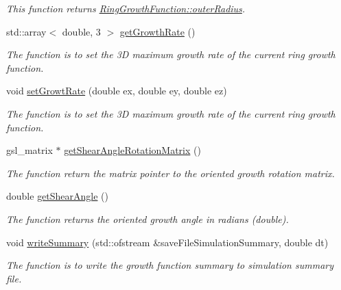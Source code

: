 \begin{DoxyCompactItemize}
\begin{DoxyCompactList}\small\item\em This function returns \hyperlink{classRingGrowthFunction_a8b7d5268d9d47f112b56feef58193649}{Ring\+Growth\+Function\+::outer\+Radius}. \end{DoxyCompactList}\item 
std\+::array$<$ double, 3 $>$ \hyperlink{classRingGrowthFunction_a1407e68d2f59cc7beacaf73c0c92bfef}{get\+Growth\+Rate} ()
\begin{DoxyCompactList}\small\item\em The function is to set the 3\+D maximum growth rate of the current ring growth function. \end{DoxyCompactList}\item 
void \hyperlink{classRingGrowthFunction_a051da280e649c81afff38a1a45cb035a}{set\+Growt\+Rate} (double ex, double ey, double ez)
\begin{DoxyCompactList}\small\item\em The function is to set the 3\+D maximum growth rate of the current ring growth function. \end{DoxyCompactList}\item 
\hypertarget{classRingGrowthFunction_a05f880ba6df8b3001a8e8fdec5ba1ad6}{}gsl\+\_\+matrix $\ast$ \hyperlink{classRingGrowthFunction_a05f880ba6df8b3001a8e8fdec5ba1ad6}{get\+Shear\+Angle\+Rotation\+Matrix} ()\label{classRingGrowthFunction_a05f880ba6df8b3001a8e8fdec5ba1ad6}

\begin{DoxyCompactList}\small\item\em The function return the matrix pointer to the oriented growth rotation matrix. \end{DoxyCompactList}\item 
\hypertarget{classRingGrowthFunction_aa70523c66dce48e7e54360596787a629}{}double \hyperlink{classRingGrowthFunction_aa70523c66dce48e7e54360596787a629}{get\+Shear\+Angle} ()\label{classRingGrowthFunction_aa70523c66dce48e7e54360596787a629}

\begin{DoxyCompactList}\small\item\em The function returns the oriented growth angle in radians (double). \end{DoxyCompactList}\item 
void \hyperlink{classRingGrowthFunction_aa4f386e127dd29d216e4bd6c2c5efbbf}{write\+Summary} (std\+::ofstream \&save\+File\+Simulation\+Summary, double dt)
\begin{DoxyCompactList}\small\item\em The function is to write the growth function summary to simulation summary file. \end{DoxyCompactList}\end{DoxyCompactItemize}
